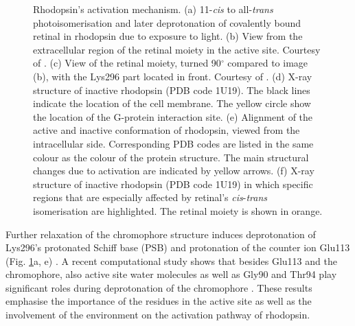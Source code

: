 \documentclass[journal=jacsat,manuscript=article]{achemso}
\begin{document}
\begin{figure}[h]
\begin{center}
\caption{Rhodopsin's activation mechanism. (a) 11-\emph{cis} to
  all-\emph{trans} photoisomerisation and later deprotonation of
  covalently bound retinal in rhodopsin due to exposure to light. (b)
  View from the extracellular region of the retinal moiety in the
  active site. Courtesy of \cite{vankeulenrhodopsin}. (c) View of the
  retinal moiety, turned 90$^{\circ}$ compared to image (b), with the
  Lys296 part located in front. Courtesy of
  \cite{vankeulenrhodopsin}. (d) X-ray structure of inactive rhodopsin
  (PDB code 1U19). The black lines indicate the location of the cell
  membrane. The yellow circle show the location of the G-protein
  interaction site. (e) Alignment of the active and inactive
  conformation of rhodopsin, viewed from the intracellular
  side. Corresponding PDB codes are listed in the same colour as the
  colour of the protein structure. The main structural changes due to
  activation are indicated by yellow arrows. (f) X-ray structure of
  inactive rhodopsin (PDB code 1U19) in which specific regions that
  are especially affected by retinal's \emph{cis}-\emph{trans}
  isomerisation are highlighted. The retinal moiety is shown in
  orange.}\label{intro_rhodopsin2}
\end{center}
\end{figure} 



Further relaxation of the chromophore structure induces deprotonation
of Lys296's protonated Schiff base (PSB) and protonation of the
counter ion Glu113 (Fig. \ref{intro_rhodopsin2}a, e)
\cite{jaeger1994identification}. A recent computational study shows
that besides Glu113 and the chromophore, also active site water
molecules as well as Gly90 and Thr94 play significant roles during
deprotonation of the chromophore \cite{vankeulenrhodopsin}. These
results emphasise the importance of the residues in the active site as
well as the involvement of the environment on the activation pathway
of rhodopsin.
\end{document}
